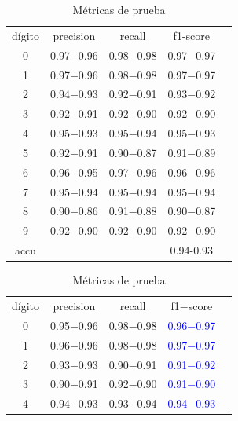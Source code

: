 \documentclass[paper=letter, fontsize=11pt]{scrartcl}
\numberwithin{equation}{section} %
\numberwithin{figure}{section} %
\numberwithin{table}{section} %
\begin{document}
\begin{table}[H]
    \centering 
    \caption{Métricas de los conjuntos de entrenamiento y prueba, usando Regresión Logistica.} \label{metricas_log_reg}
\begin{minipage}{.5\linewidth}
        \caption{Métricas de entrenamiento}
        \centering
        \begin{tabular}{|c|c|c|c|c}
        \hline
dígito  & precision&  recall & f1-score\\
0       &    0.97$-$0.96  &  0.98$-$0.98   &  0.97$-$0.97\\  
1       &    0.97$-$0.96  &  0.98$-$0.98   &  0.97$-$0.97\\  
2       &    0.94$-$0.93  &  0.92$-$0.91   &  0.93$-$0.92\\  
3       &    0.92$-$0.91  &  0.92$-$0.90   &  0.92$-$0.90\\  
4       &    0.95$-$0.93  &  0.95$-$0.94   &  0.95$-$0.93\\  
5       &    0.92$-$0.91  &  0.90$-$0.87   &  0.91$-$0.89\\  
6       &    0.96$-$0.95  &  0.97$-$0.96   &  0.96$-$0.96\\  
7       &    0.95$-$0.94  &  0.95$-$0.94   &  0.95$-$0.94\\  
8       &    0.90$-$0.86  &  0.91$-$0.88   &  0.90$-$0.87\\  
9       &    0.92$-$0.90  &  0.92$-$0.90   &  0.92$-$0.90\\  \hline \hline
accu  & & & 0.94-0.93\\ \hline \hline
        \end{tabular}
    \end{minipage}%
    \begin{minipage}{.5\linewidth}
      \centering
        \caption{Métricas de prueba}
        \begin{tabular}{|c|c|c|c|c}
        \hline
dígito  & precision &  recall & f1$-$score\\
0       &  0.95$-$0.96 &0.98$-$0.98 &  \textcolor{blue}{0.96$-$0.97}\\  
1       &  0.96$-$0.96 &0.98$-$0.98 &  \textcolor{blue}{0.97$-$0.97}\\  
2       &  0.93$-$0.93 &0.90$-$0.91 &  \textcolor{blue}{0.91$-$0.92}\\  
3       &  0.90$-$0.91 &0.92$-$0.90 &  \textcolor{blue}{0.91$-$0.90}\\  
4       &  0.94$-$0.93 &0.93$-$0.94 &  \textcolor{blue}{0.94$-$0.93}\\  

\end{tabular}
\end{minipage}
\end{table}
\end{document}
